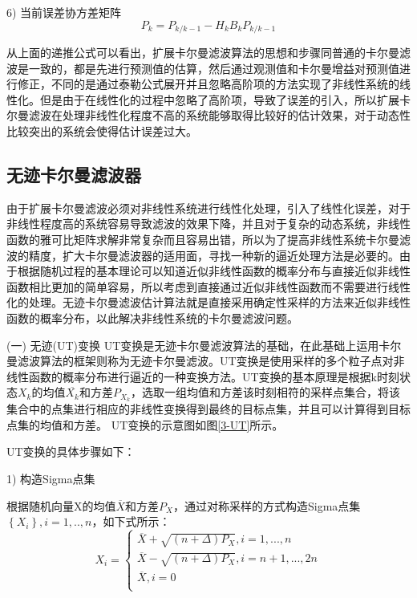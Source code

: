 6) 当前误差协方差矩阵
\begin{equation}
{{P}_{k}}={{P}_{k/k-1}}-{{H}_{k}}{{B}_{k}}{{P}_{k/k-1}}
\end{equation}  

从上面的递推公式可以看出，扩展卡尔曼滤波算法的思想和步骤同普通的卡尔曼滤波是一致的，都是先进行预测值的估算，然后通过观测值和卡尔曼增益对预测值进行修正，不同的是通过泰勒公式展开并且忽略高阶项的方法实现了非线性系统的线性化。但是由于在线性化的过程中忽略了高阶项，导致了误差的引入，所以扩展卡尔曼滤波在处理非线性化程度不高的系统能够取得比较好的估计效果，对于动态性比较突出的系统会使得估计误差过大。
\subsection{无迹卡尔曼滤波器}
由于扩展卡尔曼滤波必须对非线性系统进行线性化处理，引入了线性化误差，对于非线性程度高的系统容易导致滤波的效果下降，并且对于复杂的动态系统，非线性函数的雅可比矩阵求解非常复杂而且容易出错，所以为了提高非线性系统卡尔曼滤波的精度，扩大卡尔曼滤波器的适用面，寻找一种新的逼近处理方法是必要的。由于根据随机过程的基本理论可以知道近似非线性函数的概率分布与直接近似非线性函数相比更加的简单容易，所以考虑到直接通过近似非线性函数而不需要进行线性化的处理。无迹卡尔曼滤波估计算法就是直接采用确定性采样的方法来近似非线性函数的概率分布，以此解决非线性系统的卡尔曼滤波问题。

(一)	无迹(UT)变换
	UT变换是无迹卡尔曼滤波算法的基础，在此基础上运用卡尔曼滤波算法的框架则称为无迹卡尔曼滤波。UT变换是使用采样的多个粒子点对非线性函数的概率分布进行逼近的一种变换方法。UT变换的基本原理是根据k时刻状态${{X}_{k}}$的均值$\overline{{{X}_{k}}}$和方差${{P}_{{{X}_{k}}}}$，选取一组均值和方差该时刻相符的采样点集合，将该集合中的点集进行相应的非线性变换得到最终的目标点集，并且可以计算得到目标点集的均值和方差。 UT变换的示意图如图\ref{3-UT}所示。

UT变换的具体步骤如下：

1) 构造Sigma点集

根据随机向量X的均值$\overline{X}$和方差${{P}_{X}}$，通过对称采样的方式构造Sigma点集 $\left\{ {{X}_{i}} \right\},i=1,..,n$，如下式所示：
\begin{equation}\label{3-24}
{{X}_{i}}=\left\{ \begin{array}{l}
   \overline{X}+\sqrt{(n+\Delta ){{P}_{X}}},i=1,...,n \\ 
  \overline{X}-\sqrt{(n+\Delta ){{P}_{X}}},i=n+1,...,2n \\ 
  \overline{X},i=0 \\ 
\end{array} \right.
\end{equation}  


